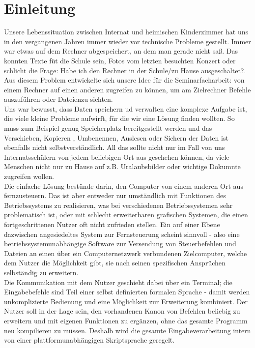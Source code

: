 %

%
\section*{Einleitung}
Unsere Lebenssituation zwischen Internat und heimischen Kinderzimmer hat uns in den vergangenen Jahren immer wieder vor technische Probleme gestellt. Immer war etwas auf dem Rechner abgespeichert, an dem man gerade nicht saß. Das konnten Texte füt die Schule sein, Fotos vom letzten besuchten Konzert oder schlicht die Frage: \glqq Habe ich den Rechner in der Schule/zu Hause ausgeschaltet?\grqq . Aus diesem Problem entwickelte sich unsere Idee für die Seminarfacharbeit: von einem Rechner auf einen anderen zugreifen zu können, um am Zielrechner Befehle auszuführen oder Dateienzu sichten.\\
Uns war bewusst, dass Daten speichern ud verwalten eine komplexe Aufgabe ist, die viele kleine Probleme aufwirft, für die wir eine Lösung finden wollten. So muss zum Beispiel genug Speicherplatz bereitgestellt werden und das Verschieben, Kopieren , Umbenennen, Auslesen oder Sichern der Daten ist ebenfalls nicht selbstverständlich. All das sollte nicht nur im Fall von uns Internatsschülern von jedem beliebigen Ort aus geschehen können, da viele Menschen nicht nur zu Hause auf z.B. Uralaubsbilder oder wichtige Dokumnte zugreifen wollen.\\
Die einfache Lösung bestünde darin, den Computer von einem anderen Ort aus fernzusteuern. Das ist aber entweder nur umständlich mit Funktionen des Betriebssystems zu realisieren, was bei verschiedenen Betriebssystemen sehr problematisch ist, oder mit schlecht erweiterbaren grafischen Systemen, die einen fortgeschrittenen Nutzer oft nicht zufrieden stellen.
Ein auf einer Ebene dazwischen angesiedeltes System zur Fernsteuerung scheint sinnvoll - also eine betriebssystemunabhängige Software zur Versendung von Steuerbefehlen und Dateien an einen über ein Computernetzwerk verbundenen Zielcomputer, welche dem Nutzer die Möglichkeit gibt, sie nach seinen spezifischen Ansprüchen selbständig zu erweitern.\\
Die Kommunikation mit dem Nutzer geschieht dabei über ein Terminal; die Eingabebefehle sind Teil einer selbst definierten formalen Sprache - damit werden unkomplizierte Bedienung und eine Möglichkeit zur Erweiterung kombiniert.
Der Nutzer soll in der Lage sein, den vorhandenen Kanon von Befehlen beliebig zu erweitern und mit eigenen Funktionen zu ergänzen, ohne das gesamte Programm neu kompilieren zu müssen. Deshalb wird die gesamte Eingabeverarbeitung intern von einer plattformunabhängigen Skriptsprache geregelt.
